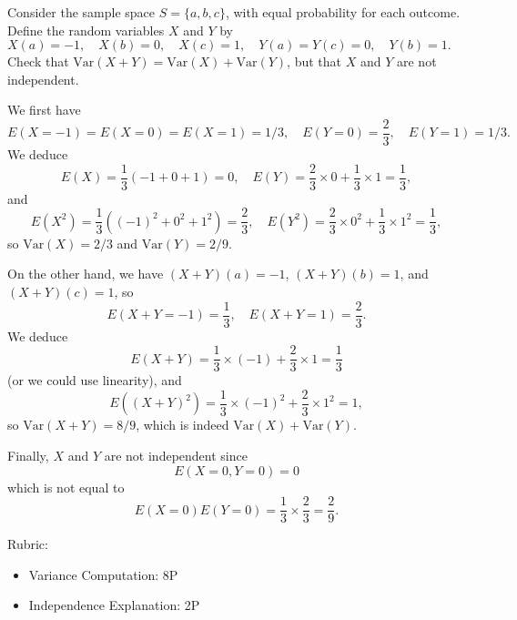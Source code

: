 \documentclass{article}
\theoremstyle{definition}
\begin{document}
\begin{question}
    Consider the sample space $S = \{ a, b, c \}$, with equal probability for each outcome. Define the random variables $X$ and  
    $Y$ by $X(a) = -1, \quad X(b) = 0, \quad X(c) = 1, \quad Y(a) = Y(c) = 0, \quad Y(b) = 1.$ 
    Check that $\mathrm{Var}(X+Y) = \mathrm{Var}(X) + \mathrm{Var}(Y)$, but that $X$ and $Y$ are not independent.
\end{question}
\begin{solution}
	We first have
	\[
	E(X = -1) = E(X = 0) = E(X = 1) = 1/3, \quad E(Y = 0) = \frac23, \quad E(Y = 1) = 1/3.
	\]
	We deduce
	\[
	E(X) = \frac13 \left ( -1 + 0 + 1 \right ) = 0, \quad E(Y) = \frac23 \times 0 + \frac13 \times 1 = \frac13,
	\]
	and
	\[
	E(X^2) = \frac13 \left ( (-1)^2 + 0^2 + 1^2 \right ) = \frac23, \quad E(Y^2) = \frac23 \times 0^2 + \frac13 \times 1^2 = \frac13,
	\]
	so $\mathrm{Var}(X) = 2/3$ and $\mathrm{Var}(Y) = 2/9$. 
	
	On the other hand, we have $(X+Y)(a) = -1$, $(X+Y)(b) = 1$, and $(X+Y)(c) = 1$, so
	\[
	E(X+Y = -1) = \frac13, \quad E(X+Y = 1) = \frac23.
	\]
	We deduce
	\[
	E(X+Y) = \frac13 \times (-1) + \frac23 \times 1 = \frac13
	\]
	(or we could use linearity), and
	\[
	E((X+Y)^2) = \frac13 \times (-1)^2 + \frac23 \times 1^2 = 1,
	\]
	so $\mathrm{Var}(X+Y) = 8/9$, which is indeed $\mathrm{Var}(X) + \mathrm{Var}(Y)$.
	
	Finally, $X$ and $Y$ are not independent since
	\[
	E(X = 0, Y = 0)  = 0 
	\]
	which is not equal to
	\[
	E(X = 0) E(Y = 0) = \frac13 \times \frac23 = \frac 29.
	\]
	
{\color{red} Rubric:
\begin{itemize}
\item Variance Computation: 8P
\item Independence Explanation: 2P
\end{itemize}}
\end{solution}
\end{document}
